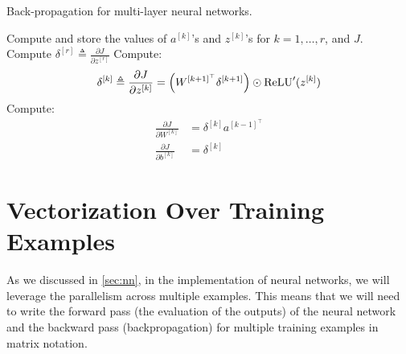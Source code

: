 \begin{algorithm}[ht]
    \caption{Back-propagation for multi-layer neural networks.}
    \label{alg:backprop_mlp}
    \begin{algorithmic}
        \State Compute and store the values of $a^{[k]}$'s and $z^{[k]}$'s for $k = 1,\ldots,r$, and $J$.
        \State{}
         
                \State Compute $\delta^{[r]} \triangleq \frac{\partial J}{\partial z^{[r]}}$
            \Else
                \State Compute:
                \begin{equation*}
                    \delta^{[k]} \triangleq \frac{\partial J}{\partial z^{[k]}} = \left(W^{[k+1]^\top} \delta^{[k+1]} \right) \odot \operatorname{ReLU}'(z^{[k]})
                \end{equation*}
            \EndIf
            \State Compute:
            \begin{align*}
                \frac{\partial J}{\partial W^{[k]}} &= \delta^{[k]} a^{[k-1]^\top}\\
                \frac{\partial J}{\partial b^{[k]}} &= \delta^{[k]}
            \end{align*}
        \EndFor
    \end{algorithmic}
\end{algorithm}

\chapter{Vectorization Over Training Examples}
As we discussed in \cref{sec:nn}, in the implementation of neural networks,
we will leverage the parallelism across multiple examples. This means that
we will need to write the forward pass (the evaluation of the outputs) of
the neural network and the backward pass (backpropagation) for multiple
training examples in matrix notation.

